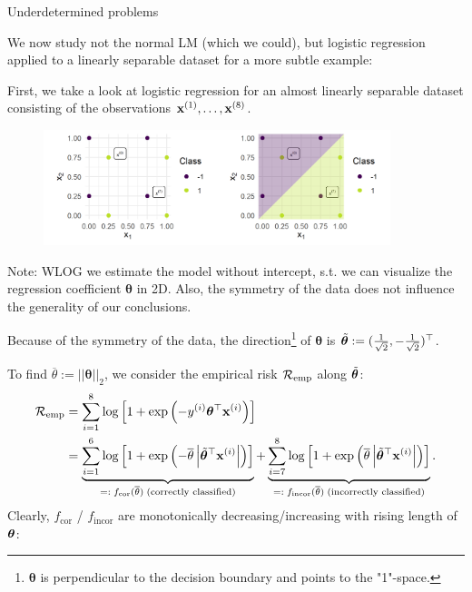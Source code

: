 \documentclass[11pt,compress,t,notes=noshow, xcolor=table]{beamer}
\begin{document}
\begin{vbframe} {Underdetermined problems}
\framebreak
\begin{footnotesize}
We now study not the normal LM (which we could), but logistic regression applied to a linearly separable dataset for a more subtle example:

\medskip
First, we take a look at logistic regression for an almost linearly separable dataset consisting of the observations $\mathbf{x}^{(1)}, \dots, \mathbf{x}^{(8)}$.
\vfill

\begin{figure}
\includegraphics[width=0.9\textwidth]{figure/underdetermined_problem_01.png}\\
\end{figure}


Note: WLOG we estimate the
model without intercept, s.t. we can visualize the regression coefficient 
$\bm{\theta}$ in 2D. Also, the symmetry of the data does not influence the generality of our conclusions.
\end{footnotesize}

\framebreak
\begin{footnotesize}
Because of the symmetry of the data, the direction\footnote[frame]{$\bm{\theta}$ is perpendicular to the decision boundary and points to the "1"-space.} of $\bm{\theta}$ is $\tilde{\bm{\theta}} := (\frac{1}{\sqrt{2}}, -\frac{1}{\sqrt{2}})^\top$.

\medskip

To find $\overline{\theta} := ||\bm{\theta}||_2$, we consider the empirical risk $\mathcal{R}_{\text{emp}}$ along $\tilde{\bm{\theta}}$:
\begin{align*}
\mathcal{R}_{\text{emp}} &= \sum^8_{i=1} \log \left[1 + \exp \left(-y^{(i)}\bm{\theta}^\top \mathbf{x}^{(i)}\right)\right] \\
&= \underbrace{\sum^6_{i=1} \log \left[1 + \exp \left(- \overline{\theta} \left|\tilde{\bm{\theta}}^\top \mathbf{x}^{(i)}\right|\right)\right]}_{=: \; f_{\text{cor}}(\overline{\theta}) \;\text{(correctly classified)}} +
\underbrace{\sum^8_{i=7}\log \left[1 + \exp \left( \overline{\theta} \left| \tilde{\bm{\theta}}^\top \mathbf{x}^{(i)}\right|\right)\right]}_{=:\; f_{\text{incor}}(\overline{\theta}) \;\text{(incorrectly classified)}}.
\end{align*}
Clearly, $f_{\text{cor}}$ / $f_{\text{incor}}$ are monotonically decreasing/increasing with rising length of $\bm{\theta}$:


\end{footnotesize}
\end{vbframe}
\end{document}
